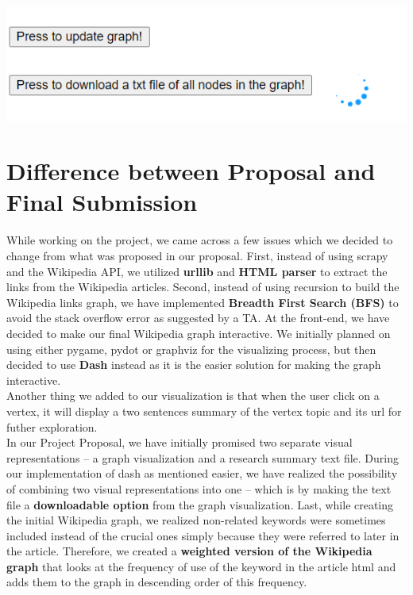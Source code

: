 \documentclass[fontsize=11pt]{article}
\begin{document}
\begin{enumerate}
\begin{itemize}
        \includegraphics[scale=0.5]{download_button_loading_icon.png}
        
    \end{itemize}
    
\end{enumerate}


\section*{Difference between Proposal and Final Submission}

\qquad While working on the project, we came across a few issues which we decided to change from what was proposed in our proposal. First, instead of using scrapy and the Wikipedia API, we utilized \textbf{urllib} and \textbf{HTML parser} to extract the links from the Wikipedia articles. Second, instead of using recursion to build the Wikipedia links graph, we have implemented \textbf{Breadth First Search (BFS)} to avoid the stack overflow error as suggested by a TA. At the front-end, we have decided to make our final Wikipedia graph interactive. We initially planned on using either pygame, pydot or graphviz for the visualizing process, but then decided to use \textbf{Dash} instead as it is the easier solution for making the graph interactive.  \\

Another thing we added to our visualization is that when the user click on a vertex, it will display a two sentences summary of the vertex topic and its url for futher exploration. \\

In our Project Proposal, we have initially promised two separate visual representations – a graph visualization and a research summary text file. During our implementation of dash as mentioned easier, we have realized the possibility of combining two visual representations into one – which is by making the text file a \textbf{downloadable option} from the graph visualization. 
Last, while creating the initial Wikipedia graph, we realized non-related keywords were sometimes included instead of the crucial ones simply because they were referred to later in the article. Therefore, we created a \textbf{weighted version of the Wikipedia graph} that looks at the frequency of use of the keyword in the article html and adds them to the graph in descending order of this frequency.
\end{document}
